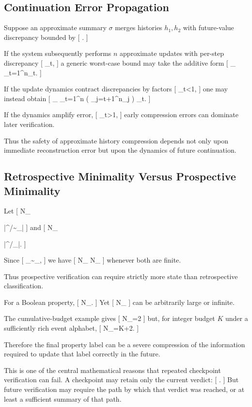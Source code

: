 \documentclass[11pt]{article}
\begin{document}
\subsection{Continuation Error Propagation}

Suppose an approximate summary $\sigma$ merges histories $h_1,h_2$ with future-value discrepancy bounded by
[
\varepsilon.
]

If the system subsequently performs $n$ approximate updates with per-step discrepancy
[
\varepsilon_t,
]
a generic worst-case bound may take the additive form
[
\varepsilon_{}
\leq
\sum_{t=1}^{n}\varepsilon_t.
]

If the update dynamics contract discrepancies by factors
[
\lambda_t<1,
]
one may instead obtain
[
\varepsilon_{}
\leq
\sum_{t=1}^{n}
\left(
\prod_{j=t+1}^{n}\lambda_j
\right)
\varepsilon_t.
]

If the dynamics amplify error,
[
\lambda_t>1,
]
early compression errors can dominate later verification.

Thus the safety of approximate history compression depends not only upon immediate reconstruction error but upon the dynamics of future continuation.

\subsection{Retrospective Minimality Versus Prospective Minimality}

Let
[
N_{}

|\Sigma^\ast/{\sim_\Phi}|
]
and
[
N_{}

|\Sigma^\ast/{\equiv_\Phi}|.
]

Since
[
\equiv_\Phi\subseteq\sim_\Phi,
]
we have
[
N_{}
\geq
N_{}
]
whenever both are finite.

Thus prospective verification can require strictly more state than retrospective classification.

For a Boolean property,
[
N_{}.
]
Yet
[
N_{}
]
can be arbitrarily large or infinite.

The cumulative-budget example gives
[
N_{}=2
]
but, for integer budget $K$ under a sufficiently rich event alphabet,
[
N_{}=K+2.
]

Therefore the final property label can be a severe compression of the information required to update that label correctly in the future.

This is one of the central mathematical reasons that repeated checkpoint verification can fail. A checkpoint may retain only the current verdict:
[
.
]
But future verification may require the path by which that verdict was reached, or at least a sufficient summary of that path.
\end{document}
